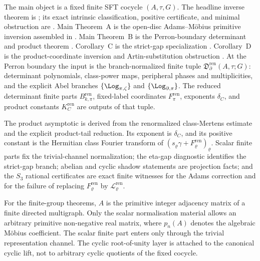 The main object is a fixed finite SFT cocycle \((A,\tau,G)\).  The headline
inverse theorem is ; its exact intrinsic
classification, positive certificate, and minimal obstruction are
.
Main Theorem~A is the open-disc Adams--M\"obius primitive inversion assembled in
.  Main Theorem~B is the
Perron-boundary determinant and product theorem
.  Corollary~C is the
strict-gap specialization .  Corollary~D
is the product-coordinate inversion and Artin-substitution obstruction
.
At the Perron boundary the input is the branch-normalized finite tuple
\(\mathfrak D_\partial^{\mathrm{ren}}(A,\tau;G)\): determinant polynomials,
class-power maps, peripheral phases and multiplicities, and the explicit Abel
branches \(\{\Log_{\pi,\zeta}\}\) and \(\{\Log_{\partial,\pi}\}\).  The reduced
determinant finite parts \(B_{k,\pi}^{\mathrm{ren}}\), fixed-label coordinates
\(F_\pi^{\mathrm{ren}}\), exponents \(\delta_C\), and product constants
\(K_C^{\mathrm{ren}}\) are outputs of that tuple.

The product asymptotic is derived from the renormalized class-Mertens estimate
and the explicit product-tail reduction.  Its exponent is
\(\delta_C\), and its positive constant is the Hermitian class Fourier
transform of
\((s_\varrho\gamma+F_\varrho^{\mathrm{ren}})_\varrho\).  Scalar finite parts
fix the trivial-channel normalization; the eta-gap diagnostic identifies the
strict-gap branch; abelian and cyclic shadow statements are projection facts;
and the \(S_3\) rational certificates are exact finite witnesses for the
Adams correction and for the failure of replacing
\(F_\varrho^{\mathrm{ren}}\) by
\(\mathcal L_\varrho^{\mathrm{ren}}\).

For the finite-group theorems, \(A\) is the primitive integer adjacency matrix
of a finite directed multigraph.  Only the scalar normalisation material allows
an arbitrary primitive non-negative real matrix, where \(p_n(A)\) denotes the
algebraic M\"obius coefficient.  The scalar finite part enters only through the
trivial representation channel.  The cyclic root-of-unity layer is attached to
the canonical cyclic lift, not to arbitrary cyclic quotients of the fixed
cocycle.

